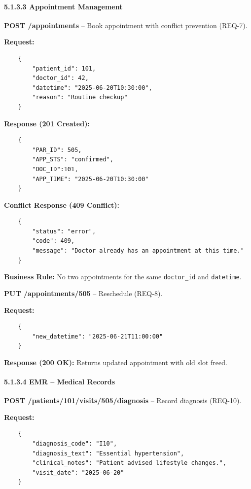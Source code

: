 \paragraph{5.1.3.3 \quad Appointment Management}

\textbf{POST /appointments} – Book appointment with conflict prevention (REQ-7).

\textbf{Request:}
\begin{verbatim}
	{
		"patient_id": 101,
		"doctor_id": 42,
		"datetime": "2025-06-20T10:30:00",
		"reason": "Routine checkup"
	}
\end{verbatim}

\textbf{Response (201 Created):}
\begin{verbatim}
	{
		"PAR_ID": 505,
		"APP_STS": "confirmed",
		"DOC_ID":101,
		"APP_TIME": "2025-06-20T10:30:00"
	}
\end{verbatim}

\textbf{Conflict Response (409 Conflict):}
\begin{verbatim}
	{
		"status": "error",
		"code": 409,
		"message": "Doctor already has an appointment at this time."
	}
\end{verbatim}

\textbf{Business Rule:} No two appointments for the same \texttt{doctor\_id} and \texttt{datetime}.

\medskip
\textbf{PUT /appointments/505} – Reschedule (REQ-8).

\textbf{Request:}
\begin{verbatim}
	{
		"new_datetime": "2025-06-21T11:00:00"
	}
\end{verbatim}

\textbf{Response (200 OK):} Returns updated appointment with old slot freed.

\paragraph{5.1.3.4 \quad EMR – Medical Records}

\textbf{POST /patients/101/visits/505/diagnosis} – Record diagnosis (REQ-10).

\textbf{Request:}
\begin{verbatim}
	{
		"diagnosis_code": "I10",
		"diagnosis_text": "Essential hypertension",
		"clinical_notes": "Patient advised lifestyle changes.",
		"visit_date": "2025-06-20"
	}
\end{verbatim}

